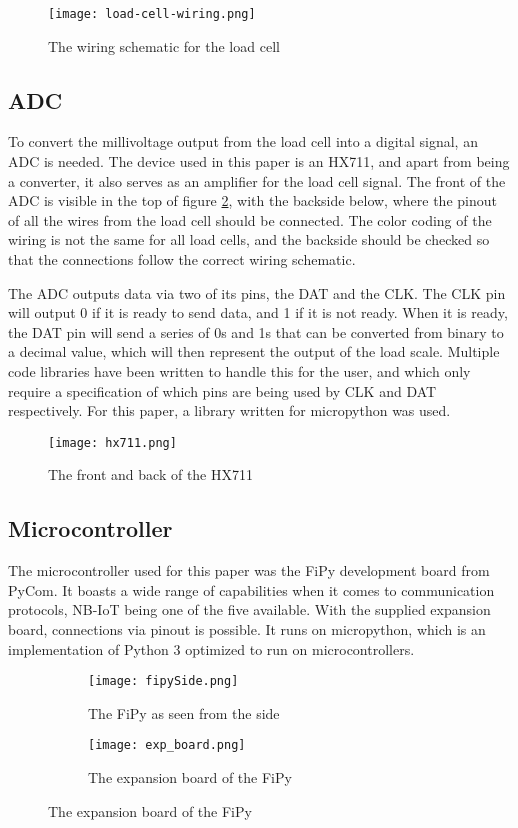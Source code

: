 \begin{figure}[h]
	\centering
	\texttt{[image: load-cell-wiring.png]}
	\caption{The wiring schematic for the load cell}
	\label{fig:wiring}
\end{figure}


\subsection{ADC}
To convert the millivoltage output from the load cell into a digital signal, an ADC is needed. The device used in this paper is an HX711, and apart from being a converter, it also serves as an amplifier for the load cell signal. The front of the ADC is visible in the top of figure \ref{fig:hx711}, with the backside below, where the pinout of all the wires from the load cell should be connected. The color coding of the wiring is not the same for all load cells, and the backside should be checked so that the connections follow the correct wiring schematic. 

The ADC outputs data via two of its pins, the DAT and the CLK. The CLK pin will output 0 if it is ready to send data, and 1 if it is not ready. When it is ready, the DAT pin will send  a series of 0s and 1s that can be converted from binary to a decimal value, which will then represent the output of the load scale.\cite{hx711-datasheet} Multiple code libraries have been written to handle this for the user, and which only require a specification of which pins are being used by CLK and DAT respectively. For this paper, a library written for micropython was used.\cite{hx711-lopy}

\begin{figure}[h]
	\centering
	\texttt{[image: hx711.png]}
	\caption{The front and back of the HX711}
	\label{fig:hx711}
\end{figure}

\subsection{Microcontroller}
The microcontroller used for this paper was the FiPy development board from PyCom. It boasts a wide range of capabilities when it comes to communication protocols, NB-IoT being one of the five available.\cite{fipy-docs} With the supplied expansion board, connections via pinout is possible. It runs on micropython, which is an implementation of Python 3 optimized to run on microcontrollers.\cite{micropython}
\begin{figure}[H]
\centering
	\begin{subfigure}[b]{0.3\textwidth}
    \texttt{[image: fipySide.png]}
    \caption{The FiPy as seen from the side}
    \label{fig:fipySide}
	\end{subfigure}
	\begin{subfigure}[b]{0.3\textwidth}
    \texttt{[image: exp\_board.png]}
    \caption{The expansion board of the FiPy}
    \label{fig:exp_board}
	\end{subfigure}
\end{figure}

